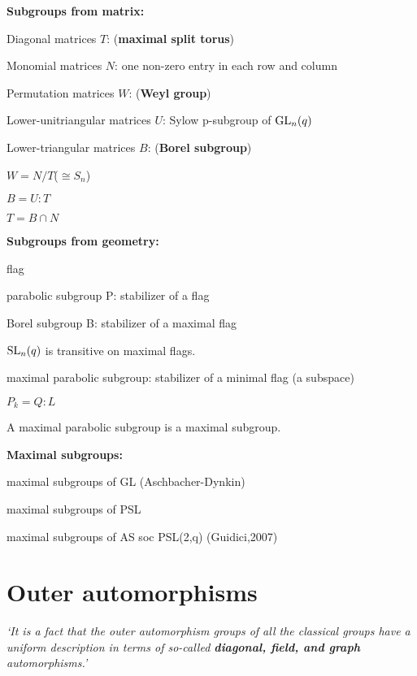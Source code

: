 \documentclass[a4paper,11pt]{article}
\def\subtitle#1{\section{#1}}
\begin{document}
\noindent\textbf{Subgroups from matrix:}

Diagonal matrices $T$: (\textbf{maximal split torus})

Monomial matrices $N$: one non-zero entry in each row and column

Permutation matrices $W$: (\textbf{Weyl group})

Lower-unitriangular matrices $U$: Sylow p-subgroup of $\mathrm{GL}_n(q)$

Lower-triangular matrices $B$: (\textbf{Borel subgroup})

$W=N/T$($\cong S_n$)

$B=U:T$

$T=B\cap N$  


\noindent\textbf{Subgroups from geometry:}

\begin{definition}
    flag
\end{definition}

parabolic subgroup P: stabilizer of a flag

Borel subgroup B: stabilizer of a maximal flag

\begin{lemma}
    $\mathrm{SL}_n(q)$ is transitive on maximal flags.
\end{lemma}

maximal parabolic subgroup: stabilizer of a minimal flag (a subspace)

$P_k=Q:L$

\begin{proposition}
    A maximal parabolic subgroup is a maximal subgroup.
\end{proposition}

\noindent\textbf{Maximal subgroups:}

maximal subgroups of GL (Aschbacher-Dynkin)

maximal subgroups of PSL

maximal subgroups of AS soc PSL(2,q) (Guidici,2007)

\subtitle{Outer automorphisms}

\textit{`It is a fact that the outer automorphism groups of all the classical groups have a uniform description in terms of so-called \textbf{diagonal, field, and graph} automorphisms.’}
\end{document}
